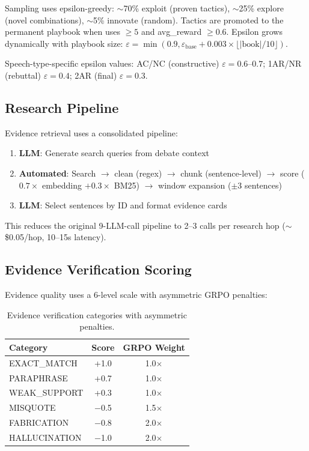 Sampling uses epsilon-greedy: $\sim$70\% exploit (proven tactics), $\sim$25\% explore (novel combinations), $\sim$5\% innovate (random). Tactics are promoted to the permanent playbook when uses $\geq 5$ and avg\_reward $\geq 0.6$. Epsilon grows dynamically with playbook size: $\varepsilon = \min(0.9, \varepsilon_{\text{base}} + 0.003 \times \lfloor|\text{book}|/10\rfloor)$.

Speech-type-specific epsilon values: AC/NC (constructive) $\varepsilon = 0.6$--$0.7$; 1AR/NR (rebuttal) $\varepsilon = 0.4$; 2AR (final) $\varepsilon = 0.3$.

\subsection{Research Pipeline}

Evidence retrieval uses a consolidated pipeline:
\begin{enumerate}
    \item \textbf{LLM}: Generate search queries from debate context
    \item \textbf{Automated}: Search $\rightarrow$ clean (regex) $\rightarrow$ chunk (sentence-level) $\rightarrow$ score ($0.7 \times$ embedding $+ 0.3 \times$ BM25) $\rightarrow$ window expansion ($\pm$3 sentences)
    \item \textbf{LLM}: Select sentences by ID and format evidence cards
\end{enumerate}

This reduces the original 9-LLM-call pipeline to 2--3 calls per research hop ($\sim$\$0.05/hop, 10--15s latency).

\subsection{Evidence Verification Scoring}

Evidence quality uses a 6-level scale with asymmetric GRPO penalties:

\begin{table}[h]
\centering
\small
\begin{tabular}{lcc}
\toprule
\textbf{Category} & \textbf{Score} & \textbf{GRPO Weight} \\
\midrule
EXACT\_MATCH & +1.0 & 1.0$\times$ \\
PARAPHRASE & +0.7 & 1.0$\times$ \\
WEAK\_SUPPORT & +0.3 & 1.0$\times$ \\
MISQUOTE & $-$0.5 & 1.5$\times$ \\
FABRICATION & $-$0.8 & 2.0$\times$ \\
HALLUCINATION & $-$1.0 & 2.0$\times$ \\
\bottomrule
\end{tabular}
\caption{Evidence verification categories with asymmetric penalties.}
\end{table}

